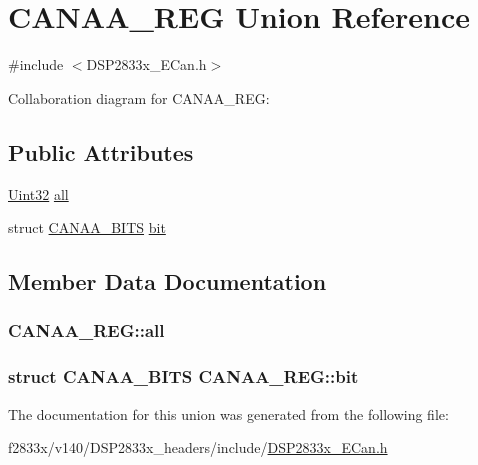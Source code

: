 \hypertarget{union_c_a_n_a_a___r_e_g}{}\section{C\+A\+N\+A\+A\+\_\+\+R\+E\+G Union Reference}
\label{union_c_a_n_a_a___r_e_g}


{\ttfamily \#include $<$D\+S\+P2833x\+\_\+\+E\+Can.\+h$>$}



Collaboration diagram for C\+A\+N\+A\+A\+\_\+\+R\+E\+G\+:
\subsection*{Public Attributes}
\begin{DoxyCompactItemize}
\item 
\hyperlink{_d_s_p2833x___device_8h_aba99025e657f892beb7ff31cecf64653}{Uint32} \hyperlink{union_c_a_n_a_a___r_e_g_a2177a8dc5056d2a9ae3964ac9e526ec6}{all}
\item 
struct \hyperlink{struct_c_a_n_a_a___b_i_t_s}{C\+A\+N\+A\+A\+\_\+\+B\+I\+T\+S} \hyperlink{union_c_a_n_a_a___r_e_g_a12b0d7f0d9939280daec3300c90bf9df}{bit}
\end{DoxyCompactItemize}


\subsection{Member Data Documentation}
\hypertarget{union_c_a_n_a_a___r_e_g_a2177a8dc5056d2a9ae3964ac9e526ec6}{}
\subsubsection[{all}]{ C\+A\+N\+A\+A\+\_\+\+R\+E\+G\+::all}\label{union_c_a_n_a_a___r_e_g_a2177a8dc5056d2a9ae3964ac9e526ec6}
\hypertarget{union_c_a_n_a_a___r_e_g_a12b0d7f0d9939280daec3300c90bf9df}{}
\subsubsection[{bit}]{\setlength{\rightskip}{0pt plus 5cm}struct {\bf C\+A\+N\+A\+A\+\_\+\+B\+I\+T\+S} C\+A\+N\+A\+A\+\_\+\+R\+E\+G\+::bit}\label{union_c_a_n_a_a___r_e_g_a12b0d7f0d9939280daec3300c90bf9df}


The documentation for this union was generated from the following file\+:\begin{DoxyCompactItemize}
\item 
f2833x/v140/\+D\+S\+P2833x\+\_\+headers/include/\hyperlink{_d_s_p2833x___e_can_8h}{D\+S\+P2833x\+\_\+\+E\+Can.\+h}\end{DoxyCompactItemize}
